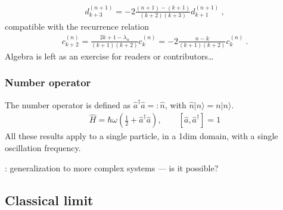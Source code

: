 \documentclass[letterpaper,10pt,english]{jupyterBook}
\begin{document}
\begin{equation*}
\begin{split}d^{(n+1)}_{k+3} = - 2 \frac{(n+1) - (k+1)}{(k+2)(k+3)} d_{k+1}^{(n+1)} \ ,\end{split}
\end{equation*}
\sphinxAtStartPar
compatible with the recurrence relation
\begin{equation*}
\begin{split}
 c_{k+2}^{(n)} = \frac{2k+1 - \lambda_n}{(k+1)(k+2)} c_k^{(n)} = - 2 \frac{n-k}{(k+1)(k+2)} c_k^{(n)} \ .
\end{split}
\end{equation*}
\sphinxAtStartPar
{} Algebra is left as an exercise for readers or contributors…


\subsubsection{Number operator}
\label{\detokenize{ch/quantum-mechanics/qft/harmonic-oscillator:number-operator}}\label{\detokenize{ch/quantum-mechanics/qft/harmonic-oscillator:quantum-mechanics-qft-harmonic-oscillator-quantization-number-operator}}
\sphinxAtStartPar
The number operator is defined as \(\hat a^\dagger\hat a=:\hat n\), with \(\hat n|n\rangle=n|n\rangle\).
\begin{equation*}
\begin{split}
\hat H=\hbar\omega\left(\tfrac12+\hat a^\dagger\hat a\right),\qquad [\hat a,\hat a^\dagger]=1
\end{split}
\end{equation*}
\sphinxAtStartPar
All these results apply to a single particle, in a 1\sphinxhyphen{}dim domain, with a single oscillation frequency.

\sphinxAtStartPar
{}: generalization to more complex systems — is it possible?


\subsection{Classical limit}
\label{\detokenize{ch/quantum-mechanics/qft/harmonic-oscillator:classical-limit}}\label{\detokenize{ch/quantum-mechanics/qft/harmonic-oscillator:quantum-mechanics-qft-harmonic-oscillator-classical-limit}}
\end{document}
